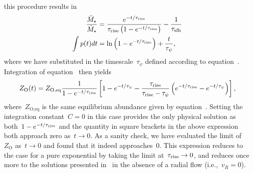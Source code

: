 \documentclass[main.tex]{subfiles}
\begin{document}
this procedure results in
\begin{subequations}\begin{align}
\frac{\ddot{M}_\star}{\dot{M}_\star} &=
\frac{
	e^{-t / \tau_\text{rise}}
}{
	\tau_\text{rise}\left(
	1 - e^{-t / \tau_\text{rise}}
	\right)
} - \frac{1}{\tau_\text{sfh}}
\\
\int p(t) dt &= \ln\left(1 - e^{-t / \tau_\text{rise}}\right) +
\frac{t}{\tau_\psi},
\end{align}\end{subequations}
where we have substituted in the timescale~$\tau_\psi$ defined according to
equation~.
Integration of equation~ then yields
\begin{equation}
Z_\text{O}(t) = Z_\text{O,eq}
\frac{1}{1 - e^{-t / \tau_\text{rise}}} \left[
1 - e^{-t / \tau_\psi} -
\frac{\tau_\text{rise}}{\tau_\text{rise} - \tau_\psi}
\left(e^{-t / \tau_\text{rise}} - e^{-t / \tau_\psi}\right)
\right],
\end{equation}
where~$Z_\text{O,eq}$ is the same equilibrium abundance given by
equation~.
Setting the integration constant~$C = 0$ in this case provides the only
physical solution as both~$1 - e^{-t / \tau_\text{rise}}$ and the quantity in
square brackets in the above expression both approach zero as~$t \rightarrow 0$.
As a sanity check, we have evaluated the limit of~$Z_\text{O}$
as~$t \rightarrow 0$ and found that it indeed approaches~$0$.
This expression reduces to the case for a pure exponential by taking the limit
at~$\tau_\text{rise} \rightarrow 0$, and reduces once more to the solutions
presented in~\citet{Weinberg2017b} in the absence of a radial flow
(i.e.,~$v_R = 0$).
\end{document}

